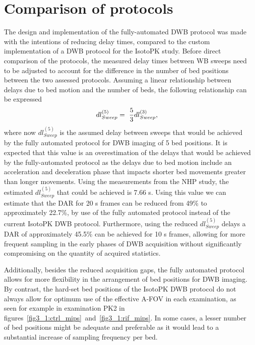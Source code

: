 \section{Comparison of protocols}
The design and implementation of the fully-automated DWB protocol was made with the intentions of reducing delay times, compared to the custom implementation of a DWB protocol for the IsotoPK study. 
Before direct comparison of the protocols, the measured delay times between WB sweeps need to be adjusted to account for the difference in the number of bed positions between the two assessed protocols. 
Assuming a linear relationship between delays due to bed motion and the number of beds, the following relationship can be expressed
%
\begin{equation} \label{eqn:acq_to_dead_time_ratio}
dl_{{Sweep}}^{(5)} =\ \frac{5}{3} dl_{{Sweep}}^{(3)}  \\ , \\ 
\end{equation}
%
where now $dl_{Sweep}^{(5)}$ is the assumed delay between sweeps that would be achieved by the fully automated protocol for DWB imaging of 5 bed positions.
It is expected that this value is an overestimation of the delays that would be achieved by the fully-automated protocol as the delays due to bed motion include an acceleration and deceleration phase that impacts shorter bed movements greater than longer movements.
Using the measurements from the NHP study, the estimated $dl_{Sweep}^{(5)}$ that could be achieved is 7.66 s. 
Using this value we can estimate that the DAR for 20 s frames can be reduced from 49\% to approximately 22.7\%, by use of the fully automated protocol instead of the current IsotoPK DWB protocol. Furthermore, using the reduced $dl_{Sweep}^{(5)}$ delays a DAR of approximately 45.5\% can be achieved for 10 s frames, allowing for more frequent sampling in the early phases of DWB acquisition without significantly compromising on the quantity of acquired statistics. 

Additionally, besides the reduced acquisition gaps, the fully automated protocol allows for more flexibility in the arrangement of bed positions for DWB imaging. By contrast, the hard-set bed positions of the IsotoPK DWB protocol do not always allow for optimum use of the effective A-FOV in each examination, as seen for example in examination PK2 in figures~\ref{fig3_1:ctrl_mips}~and~\ref{fig3_1:rif_mips}. In some cases, a lesser number of bed positions might be adequate and preferable as it would lead to a substantial increase of sampling frequency per bed.

